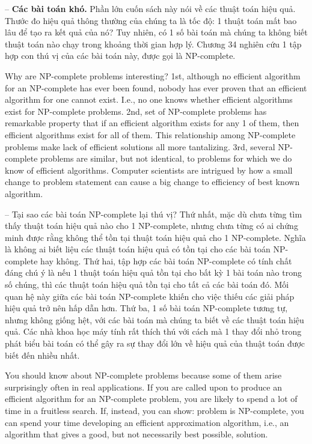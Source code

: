 \documentclass{article}
\begin{document}
\begin{itemize}
\begin{itemize}
\begin{itemize}
            -- {\bf Các bài toán khó.} Phần lớn cuốn sách này nói về các thuật toán hiệu quả. Thước đo hiệu quả thông thường của chúng ta là tốc độ: 1 thuật toán mất bao lâu để tạo ra kết quả của nó? Tuy nhiên, có 1 số bài toán mà chúng ta không biết thuật toán nào chạy trong khoảng thời gian hợp lý. Chương 34 nghiên cứu 1 tập hợp con thú vị của các bài toán này, được gọi là NP-complete.
            
            Why are NP-complete problems interesting? 1st, although no efficient algorithm for an NP-complete has ever been found, nobody has ever proven that an efficient algorithm for one cannot exist. I.e., no one knows whether efficient algorithms exist for NP-complete problems. 2nd, set of NP-complete problems has remarkable property that if an efficient algorithm exists for any 1 of them, then efficient algorithms exist for all of them. This relationship among NP-complete problems make lack of efficient solutions all more tantalizing. 3rd, several NP-complete problems are similar, but not identical, to problems for which we do know of efficient algorithms. Computer scientists are intrigued by how a small change to problem statement can cause a big change to efficiency of best known algorithm.
            
            -- Tại sao các bài toán NP-complete lại thú vị? Thứ nhất, mặc dù chưa từng tìm thấy thuật toán hiệu quả nào cho 1 NP-complete, nhưng chưa từng có ai chứng minh được rằng không thể tồn tại thuật toán hiệu quả cho 1 NP-complete. Nghĩa là không ai biết liệu các thuật toán hiệu quả có tồn tại cho các bài toán NP-complete hay không. Thứ hai, tập hợp các bài toán NP-complete có tính chất đáng chú ý là nếu 1 thuật toán hiệu quả tồn tại cho bất kỳ 1 bài toán nào trong số chúng, thì các thuật toán hiệu quả tồn tại cho tất cả các bài toán đó. Mối quan hệ này giữa các bài toán NP-complete khiến cho việc thiếu các giải pháp hiệu quả trở nên hấp dẫn hơn. Thứ ba, 1 số bài toán NP-complete tương tự, nhưng không giống hệt, với các bài toán mà chúng ta biết về các thuật toán hiệu quả. Các nhà khoa học máy tính rất thích thú với cách mà 1 thay đổi nhỏ trong phát biểu bài toán có thể gây ra sự thay đổi lớn về hiệu quả của thuật toán được biết đến nhiều nhất.
            
            You should know about NP-complete problems because some of them arise surprisingly often in real applications. If you are called upon to produce an efficient algorithm for an NP-complete problem, you are likely to spend a lot of  time in a fruitless search. If, instead, you can show: problem is NP-complete, you can spend your time developing an efficient approximation algorithm, i.e., an algorithm that gives a good, but not necessarily best possible, solution.
            

\end{itemize}
\end{itemize}
\end{itemize}
\end{document}
